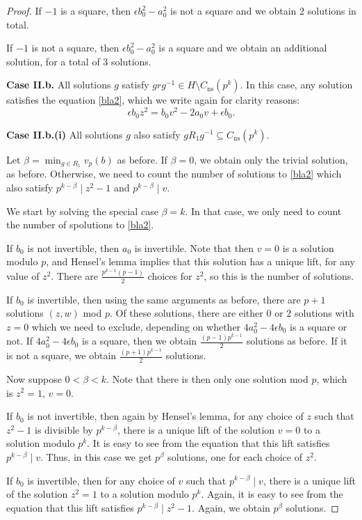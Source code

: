 \documentclass[10pt,leqno]{amsart}
\theoremstyle{definition}
\theoremstyle{remark}
\numberwithin{theorem}{section}
\begin{document}
\begin{proof}
If $-1$ is a square, then $\epsilon b_0^2-a_0^2$ is not a square and we obtain $2$ solutions in total. 

If $-1$ is not a square, then $\epsilon b_0^2-a_0^2$ is a square and we obtain an additional solution, for a total of $3$ solutions.

\noindent \textbf{Case II.b.} All solutions $g$ satisfy $grg^{-1} \in H\setminus C_{\mathrm{ns}}(p^k)$. In this case, any solution satisfies the equation \eqref{bla2}, which we write again for clarity reasons: $$\epsilon b_0 z^2=b_0 v^2-2a_0v+\epsilon b_0.$$

\noindent \textbf{Case II.b.(i)} All solutions $g$ also satisfy $gR_1g^{-1}\subseteq C_{\mathrm{ns}}(p^k)$. 

Let $\beta=\min_{g \in R_1}v_p(b)$ as before. If $\beta=0$, we obtain only the trivial solution, as before. Otherwise, we need to count the number of solutions to \eqref{bla2} which also satisfy $p^{k-\beta} \mid z^2-1$ and $p^{k-\beta} \mid v$.

We start by solving the special case $\beta=k$. In that case, we only need to count the number of spolutions to \eqref{bla2}. 

If $b_0$ is not invertible, then $a_0$ is invertible. Note that then $v=0$ is a solution modulo $p$, and Hensel's lemma implies that this solution has a unique lift, for any value of $z^2$. There are $\frac{p^{k-1}(p-1)}{2}$ choices for $z^2$, so this is the number of solutions.

If $b_0$ is invertible, then using the same arguments as before, there are $p+1$ solutions $(z,w)$ mod $p$. Of these solutions, there are either $0$ or $2$ solutions with $z=0$ which we need to exclude, depending on whether $4a_0^2-4\epsilon b_0$ is a square or not. If $4a_0^2-4\epsilon b_0$ is a square, then we obtain $\frac{(p-1)p^{k-1}}{2}$ solutions as before. If it is not a square, we obtain $\frac{(p+1)p^{k-1}}{2}$ solutions.

Now suppose $0<\beta<k$. Note that there is then only one solution mod $p$, which is $z^2=1$, $v=0$. 

If $b_0$ is not invertible, then again by Hensel's lemma, for any choice of $z$ such that $z^2-1$ is divisible by $p^{k-\beta}$, there is a unique lift of the solution $v=0$ to a solution modulo $p^k$. It is easy to see from the equation that this lift satisfies $p^{k-\beta} \mid v$. Thus, in this case we get $p^{\beta}$ solutions, one for each choice of $z^2$.

If $b_0$ is invertible, then for any choice of $v$ such that $p^{k-\beta} \mid v$, there is a unique lift of the solution $z^2=1$ to a solution modulo $p^k$. Again, it is easy to see from the equation that this lift satisfies $p^{k-\beta} \mid z^2-1$. Again, we obtain $p^\beta$ solutions.



\end{proof}
\end{document}
